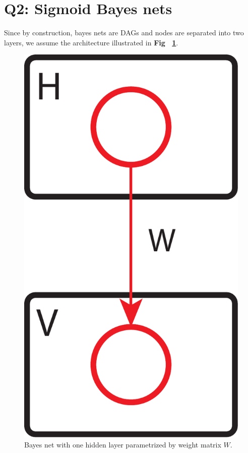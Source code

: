 \documentclass[11pt]{amsart}
\begin{document}
\section{Q2: Sigmoid Bayes nets}

Since by construction, bayes nets are DAGs and nodes are separated into two layers, we assume the architecture illustrated in {\bf Fig ~\ref{fig:bayes}}.

\begin{figure}
\centering
\includegraphics[height=0.2\textheight]{Figures/bayes.pdf}
\caption{Bayes net with one hidden layer parametrized by weight matrix $W$.}
\label{fig:bayes}
\end{figure}
\end{document}

